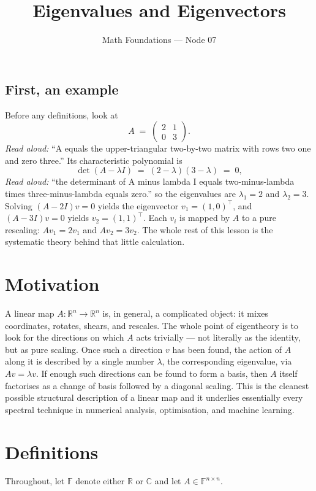 \documentclass[11pt]{article}
\title{Eigenvalues and Eigenvectors}
\author{Math Foundations --- Node 07}
\date{}
\theoremstyle{definition}
\theoremstyle{remark}
\newcommand{\R}{\mathbb{R}}
\newcommand{\C}{\mathbb{C}}
\newcommand{\F}{\mathbb{F}}
\begin{document}
\maketitle

\subsection*{First, an example}
Before any definitions, look at
\[
  A \;=\; \begin{pmatrix} 2 & 1 \\ 0 & 3 \end{pmatrix}.
\]
\emph{Read aloud:} ``A equals the upper-triangular two-by-two matrix with rows two one and zero three.''
Its characteristic polynomial is
\[
  \det(A - \lambda I) \;=\; (2-\lambda)(3-\lambda) \;=\; 0,
\]
\emph{Read aloud:} ``the determinant of A minus lambda I equals two-minus-lambda times three-minus-lambda equals zero.''
so the eigenvalues are $\lambda_1 = 2$ and $\lambda_2 = 3$. Solving
$(A - 2I)v = 0$ yields the eigenvector $v_1 = (1,0)^{\top}$, and
$(A - 3I)v = 0$ yields $v_2 = (1,1)^{\top}$. Each $v_i$ is mapped by $A$
to a pure rescaling: $A v_1 = 2 v_1$ and $A v_2 = 3 v_2$. The whole rest
of this lesson is the systematic theory behind that little calculation.

\section{Motivation}

A linear map $A : \R^n \to \R^n$ is, in general, a complicated object: it
mixes coordinates, rotates, shears, and rescales. The whole point of
eigentheory is to look for the directions on which $A$ acts trivially ---
not literally as the identity, but as pure scaling. Once such a direction
$v$ has been found, the action of $A$ along it is described by a single
number $\lambda$, the corresponding eigenvalue, via $A v = \lambda v$. If
enough such directions can be found to form a basis, then $A$ itself
factorises as a change of basis followed by a diagonal scaling. This is
the cleanest possible structural description of a linear map and it
underlies essentially every spectral technique in numerical analysis,
optimisation, and machine learning.

\section{Definitions}

Throughout, let $\F$ denote either $\R$ or $\C$ and let $A \in \F^{n\times n}$.
\end{document}
